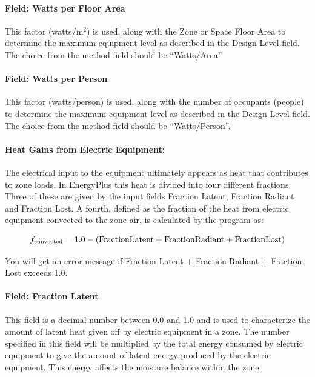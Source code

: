 \paragraph{Field: Watts per Floor Area}\label{field-watts-per-zone-floor-area-1}

This factor (watts/m\(^{2}\)) is used, along with the Zone or Space Floor Area to determine the maximum equipment level as described in the Design Level field. The choice from the method field should be ``Watts/Area''.

\paragraph{Field: Watts per Person}\label{field-watts-per-person-1}

This factor (watts/person) is used, along with the number of occupants (people) to determine the maximum equipment level as described in the Design Level field. The choice from the method field should be ``Watts/Person''.

\paragraph{Heat Gains from Electric Equipment:}\label{heat-gains-from-electric-equipment}

The electrical input to the equipment ultimately appears as heat that contributes to zone loads. In EnergyPlus this heat is divided into four different fractions. Three of these are given by the input fields Fraction Latent, Fraction Radiant and Fraction Lost. A fourth, defined as the fraction of the heat from electric equipment convected to the zone air, is calculated by the program as:

\begin{equation}
  f_{\rm{convected}} = 1.0 - (\rm{Fraction Latent} + \rm{Fraction Radiant} + \rm{Fraction Lost})
\end{equation}

You will get an error message if Fraction Latent + Fraction Radiant + Fraction Lost exceeds 1.0.

\paragraph{Field: Fraction Latent}\label{field-fraction-latent}

This field is a decimal number between 0.0 and 1.0 and is used to characterize the amount of latent heat given off by electric equipment in a zone. The number specified in this field will be multiplied by the total energy consumed by electric equipment to give the amount of latent energy produced by the electric equipment. This energy affects the moisture balance within the zone.

